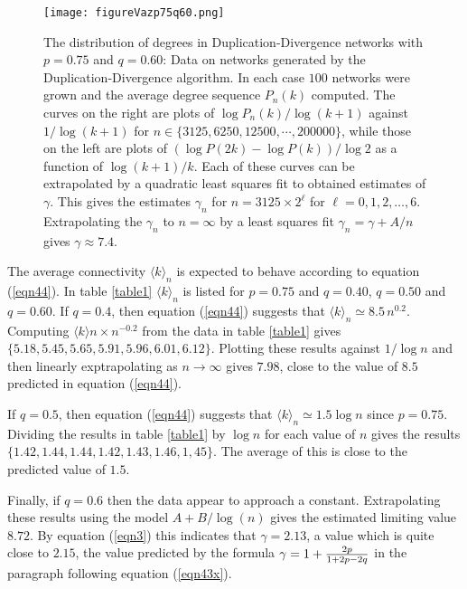 \documentclass[12pt]{iopart}
\def\sfrac#1#2{\hbox{\normalsize $\frac{#1}{#2}$}}
\def\Ref#1{(\ref{#1})}
\begin{document}
\begin{figure}[t!]
 \centering
\texttt{[image: figureVazp75q60.png]}
\caption{{The distribution of degrees in Duplication-Divergence networks with
$p=0.75$ and $q=0.60$:}
Data on networks generated by the Duplication-Divergence algorithm.  In each case $100$ networks 
were grown and the average degree sequence $P_n(k)$ computed.  The curves on the right 
are plots of $\log P_n(k)/\log (k+1)$ against $1/\log (k+1)$ for $n\in\{3125,6250,12500,\cdots,200000\}$,
while those on the left are plots of $(\log P(2k) - \log P(k))/\log 2$ as a function of 
$\log(k+1)/k$.  Each of these curves can be extrapolated by a quadratic least squares fit to
obtained estimates of $\gamma$.  This gives the estimates $\gamma_n$ for $n=3125\times 2^\ell$
for $\ell=0,1,2,\ldots, 6$.  Extrapolating the $\gamma_n$ to $n=\infty$ by a least squares
fit $\gamma_n = \gamma + A/n$ gives $\gamma\approx 7.4$.
}
\label{figureVaz60}
\end{figure}

The average connectivity $\langle k \rangle_n$ is expected to behave according
to equation \Ref{eqn44}.  In table \ref{table1} $\langle k \rangle_n$ is listed
for $p=0.75$ and $q=0.40$, $q=0.50$ and $q=0.60$.  If $q=0.4$, then equation
\Ref{eqn44} suggests that $\langle k \rangle_n \simeq 8.5\, n^{0.2}$.  Computing
$\langle k \rangle n \times n^{-0.2}$ from the data in table \ref{table1} gives
$\{5.18,5.45,5.65,5.91,5.96,6.01,6.12\}$.  Plotting these results against $1/\log n$
and then linearly exptrapolating as $n\to\infty$ gives $7.98$, close to the 
value of $8.5$ predicted in equation \Ref{eqn44}.

If $q=0.5$, then equation \Ref{eqn44} suggests that $\langle k \rangle_n
\simeq 1.5 \log n$ since $p=0.75$.  Dividing the results in table \ref{table1}
by $\log n$ for each value of $n$ gives the results $\{1.42,1.44,1.44,1.42,1.43,1.46,1,45 \}$.
The average of this is close to the predicted value of $1.5$.

Finally, if $q=0.6$ then the data appear to approach a constant. Extrapolating 
these results using the model $A + B/\log(n)$ gives the estimated limiting
value $8.72$.  By equation \Ref{eqn3} this indicates that $\gamma=2.13$,
a value which is quite close to $2.15$, the value predicted by 
the formula $\gamma = 1+ \sfrac{2p}{1+2p-2q}$ in the paragraph following equation
\Ref{eqn43x}.
\end{document}
